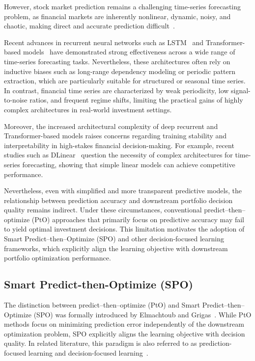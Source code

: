 \documentclass[review]{elsarticle}
\begin{document}
However, stock market prediction remains a challenging time-series forecasting problem, as financial markets are inherently nonlinear, dynamic, noisy, and chaotic, making direct and accurate prediction difficult~\cite{Deboeck1994difficulty}.

Recent advances in recurrent neural networks such as LSTM~\cite{Lindemann2021LSTMsurvey} and Transformer-based models~\cite{Wang2024TimeXer, Zhang2023TimeMixer, Nie2023PatchTST, Liu2023iTransformer} have demonstrated strong effectiveness across a wide range of time-series forecasting tasks. Nevertheless, these architectures often rely on inductive biases such as long-range dependency modeling or periodic pattern extraction, which are particularly suitable for structured or seasonal time series. In contrast, financial time series are characterized by weak periodicity, low signal-to-noise ratios, and frequent regime shifts, limiting the practical gains of highly complex architectures in real-world investment settings.

Moreover, the increased architectural complexity of deep recurrent and Transformer-based models raises concerns regarding training stability and interpretability in high-stakes financial decision-making. For example, recent studies such as DLinear~\cite{Zeng2021DLinear} question the necessity of complex architectures for time-series forecasting, showing that simple linear models can achieve competitive performance.

Nevertheless, even with simplified and more transparent predictive models, the relationship between prediction accuracy and downstream portfolio decision quality remains indirect. Under these circumstances, conventional predict--then--optimize (PtO) approaches that primarily focus on predictive accuracy may fail to yield optimal investment decisions. This limitation motivates the adoption of Smart Predict--then--Optimize (SPO) and other decision-focused learning frameworks, which explicitly align the learning objective with downstream portfolio optimization performance.

\subsection{Smart Predict-then-Optimize (SPO)}

The distinction between predict--then--optimize (PtO) and Smart Predict--then--Optimize (SPO) was formally introduced by Elmachtoub and Grigas~\cite{elmachtoub2022SPO}. While PtO methods focus on minimizing prediction error independently of the downstream optimization problem, SPO explicitly aligns the learning objective with decision quality. In related literature, this paradigm is also referred to as prediction-focused learning and decision-focused learning~\cite{mandi2024DFLReview}.
\end{document}
